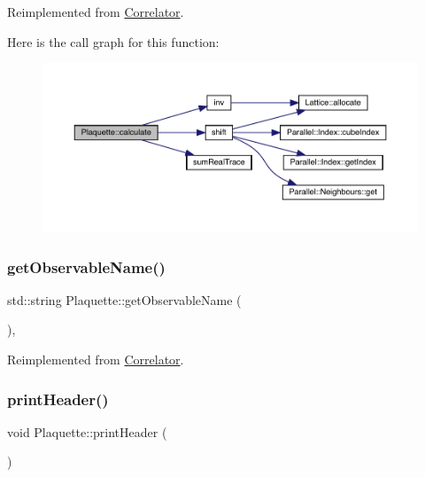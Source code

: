 Reimplemented from \mbox{\hyperlink{class_correlator_ab33502ff305f891c5c2e6d66a26a0247}{Correlator}}.

Here is the call graph for this function\+:\nopagebreak
\begin{figure}[H]
\begin{center}
\leavevmode
\includegraphics[width=350pt]{class_plaquette_a40cae6fd587c14836bdf61e69c615a00_cgraph}
\end{center}
\end{figure}
\mbox{\label{class_plaquette_a86de9d267ae1bc6a8c6d3335837ea683}} 
\subsubsection{\texorpdfstring{getObservableName()}{getObservableName()}}
{\footnotesize\ttfamily std\+::string Plaquette\+::get\+Observable\+Name (\begin{DoxyParamCaption}{ }\end{DoxyParamCaption})\hspace{0.3cm}{\ttfamily [inline]}, {\ttfamily [virtual]}}



Reimplemented from \mbox{\hyperlink{class_correlator_ad1fa59e864917c3e48da037f90c3488f}{Correlator}}.

\mbox{\label{class_plaquette_aef85b75fe7ce4780eeacf96c5da1b4b4}} 
\subsubsection{\texorpdfstring{printHeader()}{printHeader()}}
{\footnotesize\ttfamily void Plaquette\+::print\+Header (\begin{DoxyParamCaption}{ }\end{DoxyParamCaption})\hspace{0.3cm}{\ttfamily [virtual]}}



